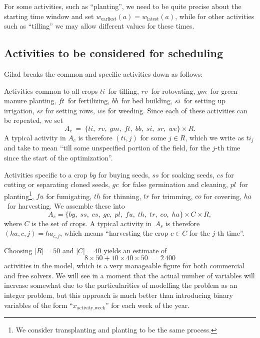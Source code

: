 \documentclass[11pt,reqno]{amsart}
\numberwithin{equation}{section}
\begin{document}
For some activities, such as ``planting'', we need to be quite precise about the starting time
window and set $w_{\text{earliest}}(a) = w_{\text{latest}}(a)$, while for other activities
such as ``tilling'' we may allow different values for these times.

\subsection{Activities to be considered for scheduling}

Gilad breaks the common and specific activities down as follows:

\begin{mydesc}
\item[Activities common to all crops] $ti$~for tilling, $rv$~for rotovating, $gm$~for
  green manure planting, $f\!t$~for fertilizing, $bb$~for bed building, $si$~for setting
  up irrigation, $sr$ for setting rows, $we$ for weeding. Since each of these activities
  can be repeated, we set
  \[
     A_c 
     \ = \
     \{ ti,\;rv,\;gm,\;f\!t,\;bb,\;si,\;sr,\;we\} \times R.
  \]
  A typical activity in $A_c$ is therefore $(ti,j)$ for some $j\in R$, which we write as
  $ti_{j}$ and take to mean ``till some unspecified portion of the field, for the $j$-th
  time since the start of the optimization''.


\item[Activities specific to a crop] $by$ for buying seeds, $ss$ for soaking seeds, $cs$
  for cutting or separating cloned seeds, $gc$~for false germination and cleaning,
  $pl$~for planting\footnote{We consider transplanting and planting to be the same
    process.}, $f\!u$ for fumigating, $th$ for thinning, $tr$ for
  trimming, $co$ for covering, $ha$~for harvesting. We assemble these into
  \[
     A_s = \{ by,\;ss,\;cs,\;gc,\;pl,\;f\!u,\;th,\;tr,\;co,\;ha\} \times C\times R,
  \]
  where $C$ is the set of crops. A typical activity in~$A_s$ is
  therefore $(ha,c, j)=ha_{c, j}$, which means ``harvesting the crop
  $c\in C$ for the $j$-th time''.
\end{mydesc}

Choosing $|R|=50$ and $|C|=40$ yields an estimate of
\[
    8\times 50 + 10\times 40 \times 50
    \ = \
    2\,400
\]
activities in the model, which is a very manageable figure for both commercial and free
solvers. We will see in a moment that the actual number of variables will increase
somewhat due to the particularities of modelling the problem as an integer problem, but
this approach is much better than introducing binary variables of the form
``$x_{\text{activity}, \text{week}}$'' for each week of the year.
\end{document}
